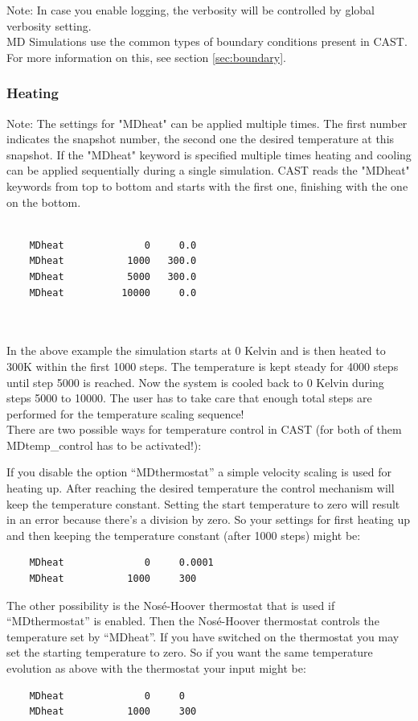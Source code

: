 \documentclass[10pt,a4paper]{article} %
\begin{document}
	Note: In case you enable logging, the verbosity will be controlled by global verbosity setting.\\
	
	\ac{MD} Simulations use the common types of boundary conditions present in \ac{CAST}. For more information on this, see section \ref{sec:boundary}.

	\subsubsection{Heating}
	Note: The settings for "MDheat" can be applied multiple times. The first number indicates the snapshot number, the second one the desired temperature at this snapshot. If the "MDheat" keyword is specified multiple times heating and cooling can be applied sequentially during a single simulation. \ac{CAST} reads the "MDheat" keywords from top to bottom and starts with the first one, finishing with the one on the bottom.\\~\\
	\begin{lstlisting}
	MDheat			    0  	  0.0
	MDheat 			 1000   300.0
	MDheat			 5000   300.0
	MDheat			10000     0.0
	\end{lstlisting}~\\~\\
	In the above example the simulation starts at 0 Kelvin and is then heated to 300K within the first 1000 steps. The temperature is kept steady for 4000 steps until step 5000 is reached. Now the system is cooled back to 0 Kelvin during steps 5000 to 10000. The user has to take care that enough total steps are performed for the temperature scaling sequence!\\
	
	There are two possible ways for temperature control in CAST (for both of them MDtemp\_control has to be activated!): 

If you disable the option ``MDthermostat'' a simple velocity scaling is used for heating up. After reaching the desired temperature the control mechanism will keep the temperature constant. Setting the start temperature to zero will result in an error because there's a division by zero. So your settings for first heating up and then keeping the temperature constant (after 1000 steps) might be:
	\begin{lstlisting}
	MDheat			    0  	  0.0001
	MDheat 			 1000     300
	\end{lstlisting}

	The other possibility is the Nosé-Hoover thermostat that is used if ``MDthermostat'' is enabled. Then the Nosé-Hoover thermostat controls the temperature set by ``MDheat''. If you have switched on the thermostat you may set the starting temperature to zero. So if you want the same temperature evolution as above with the thermostat your input might be:
		\begin{lstlisting}
	MDheat			    0  	  0
	MDheat 			 1000     300
	\end{lstlisting}
	
\end{document}
